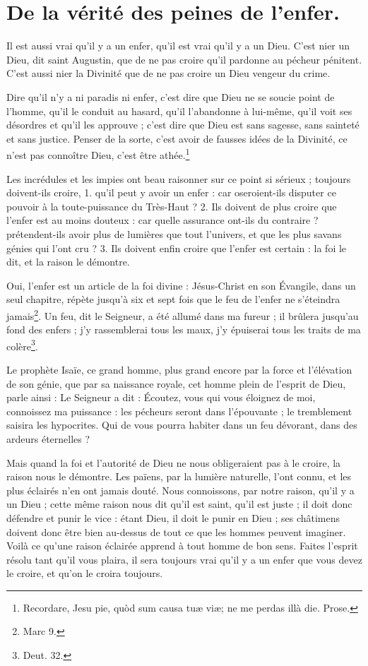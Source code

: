 \documentclass[instructions.tex]{subfiles}
\begin{document}
 
\chapter{De la vérité des peines de l’enfer.}
 
Il est aussi vrai qu’il y a un enfer, qu’il est vrai qu’il y a un Dieu. C’est nier un Dieu, dit saint Augustin, que de ne pas croire qu’il pardonne au pécheur pénitent. C’est aussi nier la Divinité que de ne pas croire un Dieu vengeur du crime.
 
Dire qu’il n’y a ni paradis ni enfer, c’est dire que Dieu ne se soucie point de l’homme, qu’il le conduit au hasard, qu’il l’abandonne à lui-même, qu’il voit ses désordres et qu’il les approuve ; c’est dire que Dieu est sans sagesse, sans sainteté et sans justice. Penser de la sorte, c’est avoir de fausses idées de la Divinité, ce n’est pas connoître Dieu, c’est être athée.\footnote{Recordare, Jesu pie, quòd sum causa tuæ viæ; ne me perdas illà die. Prose.}
 
Les incrédules et les impies ont beau raisonner sur ce point si sérieux ; toujours doivent-ils croire, 1. qu’il peut y avoir un enfer : car oseroient-ils disputer ce pouvoir à la toute-puissance du Très-Haut ? 2. Ils doivent de plus croire que l’enfer est au moins douteux : car quelle assurance ont-ils du contraire ? prétendent-ils avoir plus de lumières que tout l’univers, et que les plus savans génies qui l’ont cru ? 3. Ils doivent enfin croire que l’enfer est certain : la foi le dit, et la raison le démontre.
 
Oui, l’enfer est un article de la foi divine : Jésus-Christ en son Évangile, dans un seul chapitre, répète jusqu’à six et sept fois que le feu de l’enfer ne s’éteindra jamais\footnote{Marc 9.}. Un feu, dit le Seigneur, a été allumé dans ma fureur ; il brûlera jusqu’au fond des enfers ; j’y rassemblerai tous les maux, j’y épuiserai tous les traits de ma colère\footnote{Deut. 32.}.
 
Le prophète Isaïe, ce grand homme, plus grand encore par la force et l’élévation de son génie, que par sa naissance royale, cet homme plein de l’esprit de Dieu, parle ainsi : Le Seigneur a dit : Écoutez, vous qui vous éloignez de moi, connoissez ma puissance : les pécheurs seront dans l’épouvante ; le tremblement saisira les hypocrites. Qui de vous pourra habiter dans un feu dévorant, dans des ardeurs éternelles ?
 
Mais quand la foi et l’autorité de Dieu ne nous obligeraient pas à le croire, la raison nous le démontre. Les païens, par la lumière naturelle, l’ont connu, et les plus éclairés n’en ont jamais douté. Nous connoissons, par notre raison, qu’il y a un Dieu ; cette même raison nous dit qu’il est saint, qu’il est juste ; il doit donc défendre et punir le vice : étant Dieu, il doit le punir en Dieu ; ses châtimens doivent donc être bien au-dessus de tout ce que les hommes peuvent imaginer. Voilà ce qu’une raison éclairée apprend à tout homme de bon sens. Faites l’esprit résolu tant qu’il vous plaira, il sera toujours vrai qu’il y a un enfer que vous devez le croire, et qu’on le croira toujours.
 
\end{document}
